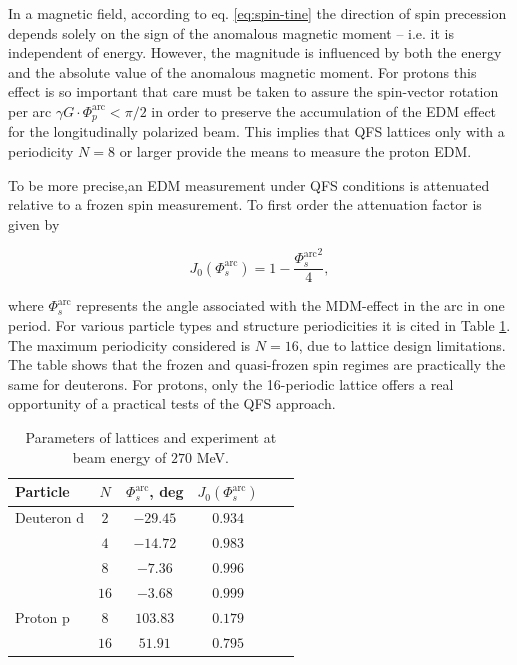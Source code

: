 \documentclass[submitting]{nst}
\begin{document}
\par In a magnetic field, according to eq. \ref{eq:spin-tine} the direction of spin precession depends solely on the sign of the anomalous magnetic moment -- i.e. it is independent of energy. However, the magnitude is influenced by both the energy and the absolute value of the anomalous magnetic moment. For protons this effect is so important that care must be taken to assure the spin-vector rotation per arc $\gamma G \cdot \Phi_{p}^{\text{arc}} < \pi/2$ in order to preserve the accumulation of the EDM effect for the longitudinally polarized beam. This implies that QFS lattices only with a periodicity $N=8$ or larger provide the means to measure the proton EDM.

\par To be more precise,an EDM measurement under QFS conditions is attenuated relative to a frozen spin measurement. To first order the attenuation factor is given by \cite{consider}

\begin{equation}
	J_{0}(\Phi_s^{\textrm{arc}})=1-\frac{{\Phi_s^{\textrm{arc}}}^2}{4},
	\label{eq:edm}
\end{equation}

\noindent where $\Phi_s^{\textrm{arc}}$ represents the angle associated with the MDM-effect in the arc in one period. For various particle types and structure periodicities it is cited in Table \ref{tab:edm}. The maximum periodicity considered is $N=16$, due to lattice design limitations. The table shows that the frozen and quasi-frozen spin regimes are practically the same for deuterons. For protons, only the 16-periodic lattice offers a real opportunity of a practical tests of the QFS approach.

\begin{table}[!htb]
	\caption{Parameters of lattices and experiment at beam energy of $270$ MeV.}
	\label{tab:edm}
	\begin{tabular*}{8cm} {@{\extracolsep{\fill} } lccccc}
		\toprule
		Particle & $N$ & $\Phi_s^{\textrm{arc}}$, deg & $J_{0}(\Phi_s^{\textrm{arc}})$ \\
		\midrule
		Deuteron $\text{d}$ & $2$   & $-29.45$ & $0.934$ \\
				 			& $4$   & $-14.72$ & $0.983$ \\
				 			& $8$   & $-7.36$ & $0.996$ \\
				 			& $16$   & $-3.68$ & $0.999$ \\
		Proton $\text{p}$ & $8$  &  $103.83$	   & $0.179$\\
						  & $16$  &  $51.91$	   & $0.795$\\
		\bottomrule
	\end{tabular*}
\end{table}
\end{document}

